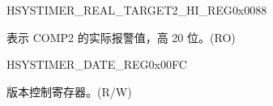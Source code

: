 \begin{register}{H}{SYSTIMER\_REAL\_TARGET2\_HI\_REG}{0x0088}\label{regdesc:SYSTIMERREALTARGET2HIREG}
%
%
\regnewline%
\begin{regdesc}\begin{reglist}
\label{fielddesc:SYSTIMERTARGET2HIRO}\item [SYSTIMER\_TARGET2\_HI\_RO] 表示 COMP2 的实际报警值，高 20 位。(RO)
\end{reglist}\end{regdesc}
\end{register}


\begin{register}{H}{SYSTIMER\_DATE\_REG}{0x00FC}\label{regdesc:SYSTIMERDATEREG}
%
\regnewline%
\begin{regdesc}\begin{reglist}
\label{fielddesc:SYSTIMERDATE}\item [SYSTIMER\_DATE] 版本控制寄存器。(R/W)
\end{reglist}\end{regdesc}
\end{register}


